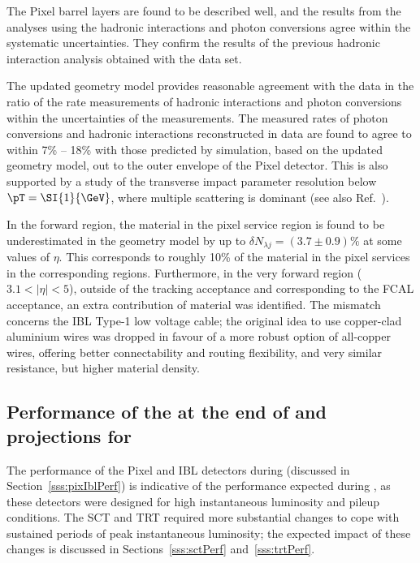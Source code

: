 \documentclass[cernpreprint, atlasdraft=false, UKenglish,british,orcidlogo, texmf, orcidlogo]{atlasdoc}
\begin{document}
 
The Pixel barrel layers are found to be described well, and the results from the analyses using the hadronic interactions and photon conversions agree within the systematic uncertainties.
They confirm the results of the previous hadronic interaction analysis obtained with the \RunOne data set.
 
The updated geometry model provides reasonable agreement with the data in the ratio of the rate measurements of hadronic interactions and photon conversions within the uncertainties of the measurements. The measured rates of photon conversions and hadronic interactions reconstructed in data are found to agree to within 7\% -- 18\% with those predicted by simulation, based on the updated geometry model, out to the outer envelope of the Pixel detector. This is also supported by a study of the transverse impact parameter resolution below $\pT=\SI{1}{\GeV}$, where multiple scattering is dominant (see also Ref.~\cite{PERF-2015-07}).
 
 
 
In the forward region, the material in the pixel service region is found to be underestimated in the geometry model by up to $\delta N_{\lambda j} = (3.7 \pm 0.9)\%$ at some values of $\eta$. This corresponds to roughly 10\% of the material in the pixel services in the corresponding regions.
Furthermore, in the very forward region ($3.1 < | \eta | < 5 $), outside of the tracking acceptance and corresponding to the \gls{FCAL} acceptance, an extra contribution of material was identified.
The mismatch concerns the \gls{IBL} Type-1 low voltage cable; the original idea to use copper-clad aluminium wires was dropped in favour of a more robust option of all-copper wires, offering better connectability and routing flexibility, and very similar resistance, but higher material density.
 


 

 
\subsection{Performance of the  at the end of \RunTwo and projections for \RunThr}
The performance of the Pixel and \gls{IBL} detectors during \RunTwo (discussed in Section~\ref{sss:pixIblPerf}) is indicative of the performance expected during \RunThr, as these detectors were designed for high instantaneous luminosity and pileup conditions. The \gls{SCT} and \gls{TRT} required more substantial changes to cope with sustained periods of peak instantaneous luminosity; the expected impact of these changes is discussed in Sections~\ref{sss:sctPerf} and~\ref{sss:trtPerf}.
 
\end{document}

